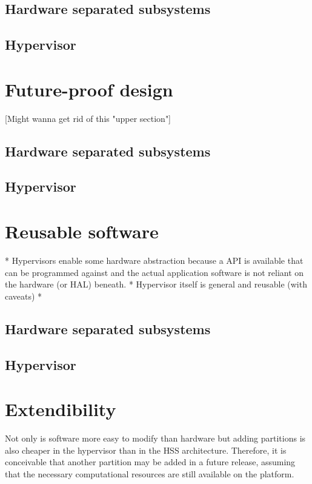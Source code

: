 \subsection{Hardware separated subsystems}
\subsection{Hypervisor}


\section{Future-proof design}
[Might wanna get rid of this "upper section"]
\subsection{Hardware separated subsystems}
\subsection{Hypervisor}


\section{Reusable software}
* Hypervisors enable some hardware abstraction because a API is available that can be programmed against and the actual application software is not reliant on the hardware (or HAL) beneath.
* Hypervisor itself is general and reusable (with caveats)
* 
\subsection{Hardware separated subsystems}
\subsection{Hypervisor}


\section{Extendibility}
Not only is software more easy to modify than hardware but adding partitions is also cheaper in the hypervisor than in the \gls{HSS} architecture. Therefore, it is conceivable that another partition may be added in a future release, assuming that the necessary computational resources are still available on the platform. 

